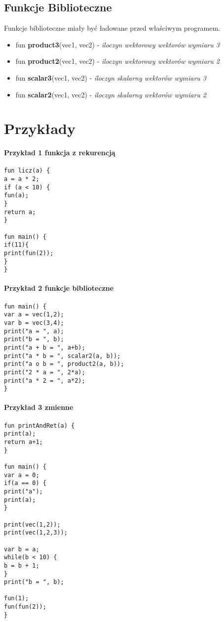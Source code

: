 \documentclass[11pt]{article} %
\begin{document}
\subsection{Funkcje Biblioteczne}
Funkcje biblioteczne miały być ładowane przed właściwym programem.
\begin{itemize}
	\item fun \textbf{product3}(vec1, vec2) - \textit{iloczyn wektorowy wektorów wymiaru 3}
	\item fun \textbf{product2}(vec1, vec2) - \textit{iloczyn wektorowy wektorów wymiaru 2}
	\item fun \textbf{scalar3}(vec1, vec2) - \textit{iloczyn skalarny wektorów wymiaru 3}
	\item fun \textbf{scalar2}(vec1, vec2) - \textit{iloczyn skalarny wektorów wymiaru 2}
\end{itemize}

\section{Przykłady}

\paragraph{Przykład 1 funkcja z rekurencją}
\begin{verbatim}
fun licz(a) {
a = a * 2;   
if (a < 10) {      
fun(a);   
}    		 
return a;  	
}  				

fun main() {
if(11){
print(fun(2));
}
}					
\end{verbatim}

\paragraph{Przykład 2 funkcje biblioteczne}
\begin{verbatim}
fun main() {
var a = vec(1,2);
var b = vec(3,4);
print("a = ", a);
print("b = ", b);
print("a + b = ", a+b);
print("a * b = ", scalar2(a, b));
print("a o b = ", product2(a, b));
print("2 * a = ", 2*a);    	
print("a * 2 = ", a*2);
}   
\end{verbatim}

\paragraph{Przykład 3 zmienne}
\begin{verbatim}
fun printAndRet(a) {
print(a);
return a+1;
}

fun main() {
var a = 0;
if(a == 0) {
print("a");
print(a);
}

print(vec(1,2));
print(vec(1,2,3));

var b = a;
while(b < 10) {
b = b + 1;
}
print("b = ", b);

fun(1);
fun(fun(2));
}   
\end{verbatim}
\end{document}
